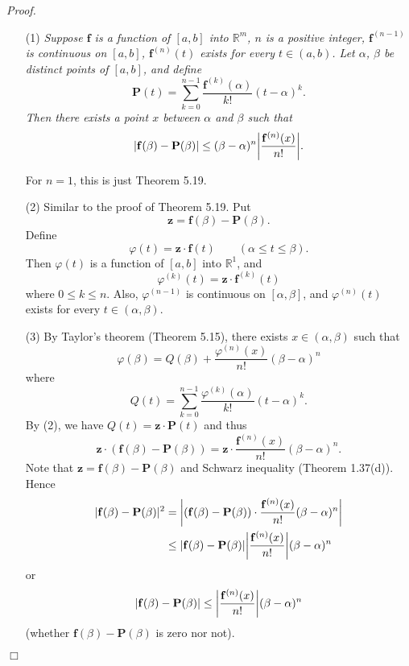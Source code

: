 \documentclass{article}
\begin{document}
\emph{Proof.}
\begin{enumerate}
  \item[(1)]
  \emph{Suppose $\mathbf{f}$ is a function of $[a,b]$ into $\mathbb{R}^{m}$,
  $n$ is a positive integer,
  $\mathbf{f}^{(n-1)}$ is continuous on $[a,b]$,
  $\mathbf{f}^{(n)}(t)$ exists for every $t \in (a,b)$.
  Let $\alpha$, $\beta$ be distinct points of $[a,b]$, and define
  \[
    \mathbf{P}(t) = \sum_{k=0}^{n-1} \frac{\mathbf{f}^{(k)}(\alpha)}{k!}(t - \alpha)^k.
  \]
  Then there exists a point $x$ between $\alpha$ and $\beta$ such that}
  \[
    \abs{ \mathbf{f}(\beta) - \mathbf{P}(\beta) }
    \leq (\beta - \alpha)^n \abs{\frac{\mathbf{f}^{(n)}(x)}{n!}}.
  \]

  For $n = 1$, this is just Theorem 5.19.

  \item[(2)]
  Similar to the proof of Theorem 5.19.
  Put
  \[
    \mathbf{z} = \mathbf{f}(\beta) - \mathbf{P}(\beta).
  \]
  Define
  \[
    \varphi(t) = \mathbf{z} \cdot \mathbf{f}(t)
    \qquad (\alpha \leq t \leq \beta).
  \]
  Then $\varphi(t)$ is a function of $[a,b]$ into $\mathbb{R}^1$, and
  \[
    \varphi^{(k)}(t) = \mathbf{z} \cdot \mathbf{f}^{(k)}(t)
  \]
  where $0 \leq k \leq n$.
  Also, $\varphi^{(n-1)}$ is continuous on $[\alpha,\beta]$,
  and $\varphi^{(n)}(t)$ exists for every $t \in (\alpha,\beta)$.

  \item[(3)]
  By Taylor's theorem (Theorem 5.15), there exists $x \in (\alpha,\beta)$ such that
  \[
    \varphi(\beta) = Q(\beta) + \frac{\varphi^{(n)}(x)}{n!}(\beta-\alpha)^n
  \]
  where
  \[
    Q(t) = \sum_{k=0}^{n-1} \frac{\varphi^{(k)}(\alpha)}{k!}(t - \alpha)^k.
  \]
  By (2), we have $Q(t) = \mathbf{z} \cdot \mathbf{P}(t)$ and thus
  \[
    \mathbf{z} \cdot (\mathbf{f}(\beta) - \mathbf{P}(\beta))
    = \mathbf{z} \cdot \frac{\mathbf{f}^{(n)}(x)}{n!}(\beta-\alpha)^n.
  \]
  Note that $\mathbf{z} = \mathbf{f}(\beta) - \mathbf{P}(\beta)$
  and Schwarz inequality (Theorem 1.37(d)).
  Hence
  \begin{align*}
    |\mathbf{f}(\beta) - \mathbf{P}(\beta)|^2
    &=
    \abs{ (\mathbf{f}(\beta) - \mathbf{P}(\beta))
      \cdot \frac{\mathbf{f}^{(n)}(x)}{n!}(\beta-\alpha)^n } \\
    &\leq
      \abs{ \mathbf{f}(\beta) - \mathbf{P}(\beta) }
      \abs{ \frac{\mathbf{f}^{(n)}(x)}{n!} } (\beta-\alpha)^n
  \end{align*}
  or
  \[
    |\mathbf{f}(\beta) - \mathbf{P}(\beta)|
    \leq \abs{ \frac{\mathbf{f}^{(n)}(x)}{n!} } (\beta-\alpha)^n
  \]
  (whether $\mathbf{f}(\beta) - \mathbf{P}(\beta)$ is zero nor not).
\end{enumerate}
$\Box$ \\\\
\end{document}
